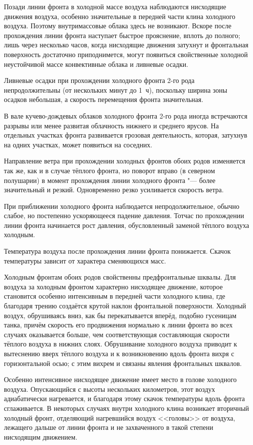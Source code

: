 \documentclass[a4paper, 12pt, twoside, draft, book, russian, fittopage, cyremdash, openright]{ncc}
\begin{document}
Позади линии фронта в холодной массе воздуха наблюдаются нисходящие
движения воздуха, особенно значительные в передней части клина
холодного воздуха. Поэтому внутримассовые облака здесь не
возникают. Вскоре после прохождения линии фронта наступает быстрое
прояснение, вплоть до полного; лишь через несколько часов, когда
нисходящие движения затухнут и фронтальная поверхность достаточно
приподнимется, могут появиться свойственные холодной неустойчивой
массе конвективные облака и ливневые осадки.

Ливневые осадки при прохождении холодного фронта 2-го рода
непродолжительны (от нескольких минут до 1~ч), поскольку ширина зоны
осадков небольшая, а скорость перемещения фронта значительная.

В вале кучево-дождевых облаков холодного фронта 2-го рода иногда
встречаются разрывы или менее развитая облачность нижнего и среднего
ярусов. На отдельных участках фронта развивается грозовая
деятельность, которая, затухнув на одних участках, может появиться на
соседних.

Направление ветра при прохождении холодных фронтов обоих родов
изменяется так же, как и в случае тёплого фронта, но поворот вправо
(в северном полушарии) в момент прохождения линии холодного фронта "---
более значительный и резкий. Одновременно резко усиливается скорость
ветра.

При приближении холодного фронта наблюдается непродолжительное,
обычно слабое, но постепенно ускоряющееся падение давления. Тотчас по
прохождении линии фронта начинается рост давления, обусловленный
заменой тёплого воздуха холодным.

Температура воздуха после прохождения линии фронта понижается. Скачок
температуры зависит от характера сменяющихся масс.

Холодным фронтам обоих родов свойственны предфронтальные шквалы. Для
воздуха за холодным фронтом характерно нисходящее движение, которое
становится особенно интенсивным в передней части холодного клина, где
благодаря трению создаётся крутой наклон фронтальной
поверхности. Холодный воздух, обрушиваясь вниз, как бы перекатывается
вперёд, подобно гусеницам танка, причём скорость его продвижения
нормально к линии фронта во всех случаях оказывается больше, чем
соответствующая составляющая скорости тёплого воздуха в нижних
слоях. Обрушивание холодного воздуха приводит к вытеснению вверх
тёплого воздуха и к возникновению вдоль фронта вихря с горизонтальной
осью; с этим вихрем и связаны явления фронтальных шквалов.

Особенно интенсивное нисходящее движение имеет место в голове
холодного воздуха. Опускающийся с высоты нескольких километров, этот
воздух адиабатически нагревается, и благодаря этому скачок температуры
вдоль фронта сглаживается. В некоторых случаях внутри холодного клина
возникает вторичный холодный фронт, отделяющий нагревшийся воздух
<<головы>> от воздуха, лежащего дальше от линии фронта и не
захваченного в такой степени нисходящим движением.
\end{document}
